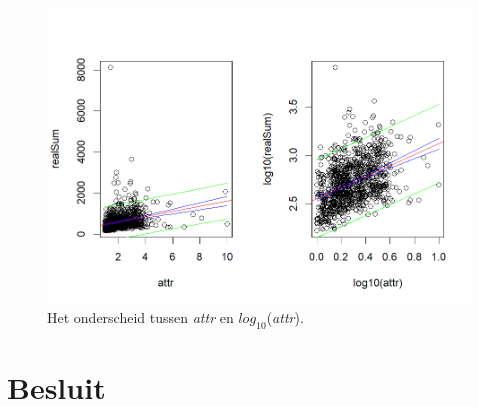 \documentclass[a4paper]{kulakarticle}
\begin{document}
	\begin{figure}
		\centering
		\includegraphics[width=0.9\linewidth]{Figuren/betr.attr}
		\caption{Het onderscheid tussen \textit{attr} en $log_{10}$(\textit{attr}).}
		\label{fig:betr}
	\end{figure}


	
	
	
	\section*{Besluit}
	
	
\end{document}

